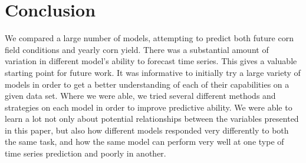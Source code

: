 \documentclass[a4paper]{apa6}
\begin{document}
\section*{Conclusion}
We compared a large number of models, attempting to predict both future corn field conditions and yearly corn yield. There was a substantial amount of variation in different model's ability to forecast time series. This gives a valuable starting point for future work. It was informative to initially try a large variety of models in order to get a better understanding of each of their capabilities on a given data set. Where we were able, we tried several different methods and strategies on each model in order to improve predictive ability. We were able to learn a lot not only about potential relationships between the variables presented in this paper, but also how different models responded very differently to both the same task, and how the same model can perform very well at one type of time series prediction and poorly in another. 
\end{document}
